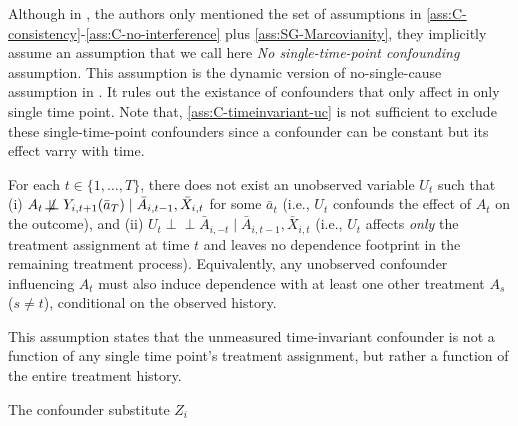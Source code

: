 Although in \cite{hattSequentialDeconfoundingCausal2024}, the authors only mentioned the 
set of assumptions in \ref{ass:C-consistency}-\ref{ass:C-no-interference} plus \ref{ass:SG-Marcovianity}, they 
implicitly assume an assumption that we call here \emph{No single-time-point confounding} assumption. This  
assumption is the dynamic version of no-single-cause assumption in \cite{wangBlessingsMultipleCauses2019}. It rules 
out the existance of confounders that only affect in only single time point. Note that, \ref{ass:C-timeinvariant-uc} is not 
sufficient to exclude these single-time-point confounders since a confounder can be constant but its effect 
varry with time. 

\begin{idassumpSG}
    \label{ass:SG-No-single-time-point-confounding}
    For each $t\in\{1,\dots,T\}$, there does not exist an unobserved variable $U_t$ such that
    (i) $A_t \not\!\perp\!\!\!\perp Y_{i,t+1}(\bar a_T)\mid \bar A_{i,t-1},\bar X_{i,t}$ for some $\bar a_t$ (i.e., $U_t$ 
    confounds the effect of $A_t$ on the outcome),
    and (ii) $U_t \perp\!\!\!\perp \bar A_{i,-t}\mid \bar A_{i,t-1},\bar X_{i,t}$ (i.e., $U_t$ 
    affects \emph{only} the treatment assignment at time $t$ and leaves no dependence 
    footprint in the remaining treatment process).
    Equivalently, any unobserved confounder influencing $A_t$ must also induce 
    dependence with at least one other treatment $A_s$ ($s\neq t$), conditional on the observed history.
\end{idassumpSG}
This assumption states that the unmeasured time-invariant confounder is not a function of any single time point's treatment assignment, but rather a function of the entire treatment history. 

\begin{idassumpSG}
    \label{ass:SG-Consistency}
    The confounder substitute $Z_i$
    
\end{idassumpSG}

